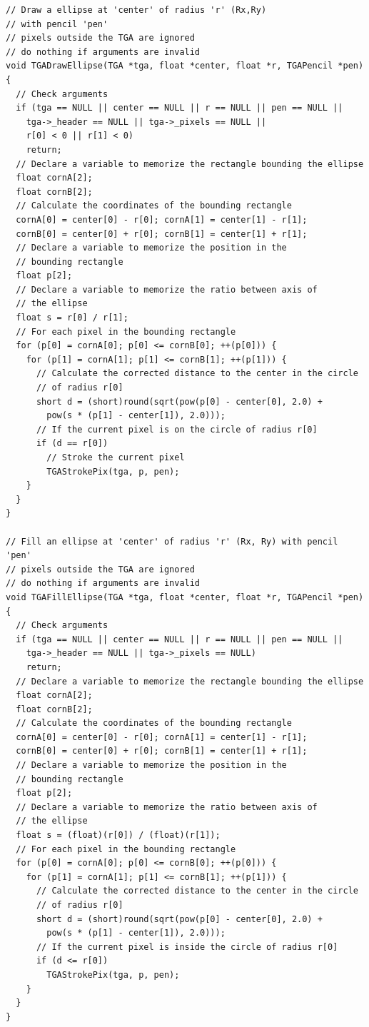 \documentclass[12pt, a4paper]{article}
\begin{document}
\begin{scriptsize}
\begin{ttfamily}
\begin{lstlisting}
// Draw a ellipse at 'center' of radius 'r' (Rx,Ry) 
// with pencil 'pen' 
// pixels outside the TGA are ignored
// do nothing if arguments are invalid
void TGADrawEllipse(TGA *tga, float *center, float *r, TGAPencil *pen) {
  // Check arguments
  if (tga == NULL || center == NULL || r == NULL || pen == NULL ||
    tga->_header == NULL || tga->_pixels == NULL || 
    r[0] < 0 || r[1] < 0)
    return;
  // Declare a variable to memorize the rectangle bounding the ellipse
  float cornA[2];
  float cornB[2];
  // Calculate the coordinates of the bounding rectangle
  cornA[0] = center[0] - r[0]; cornA[1] = center[1] - r[1];
  cornB[0] = center[0] + r[0]; cornB[1] = center[1] + r[1];
  // Declare a variable to memorize the position in the 
  // bounding rectangle
  float p[2];
  // Declare a variable to memorize the ratio between axis of 
  // the ellipse
  float s = r[0] / r[1];
  // For each pixel in the bounding rectangle
  for (p[0] = cornA[0]; p[0] <= cornB[0]; ++(p[0])) {
    for (p[1] = cornA[1]; p[1] <= cornB[1]; ++(p[1])) {
      // Calculate the corrected distance to the center in the circle
      // of radius r[0] 
      short d = (short)round(sqrt(pow(p[0] - center[0], 2.0) + 
        pow(s * (p[1] - center[1]), 2.0)));
      // If the current pixel is on the circle of radius r[0]
      if (d == r[0]) 
        // Stroke the current pixel
        TGAStrokePix(tga, p, pen);
    }
  }
}

// Fill an ellipse at 'center' of radius 'r' (Rx, Ry) with pencil 'pen'
// pixels outside the TGA are ignored
// do nothing if arguments are invalid
void TGAFillEllipse(TGA *tga, float *center, float *r, TGAPencil *pen) {
  // Check arguments
  if (tga == NULL || center == NULL || r == NULL || pen == NULL ||
    tga->_header == NULL || tga->_pixels == NULL)
    return;
  // Declare a variable to memorize the rectangle bounding the ellipse
  float cornA[2];
  float cornB[2];
  // Calculate the coordinates of the bounding rectangle
  cornA[0] = center[0] - r[0]; cornA[1] = center[1] - r[1];
  cornB[0] = center[0] + r[0]; cornB[1] = center[1] + r[1];
  // Declare a variable to memorize the position in the 
  // bounding rectangle
  float p[2];
  // Declare a variable to memorize the ratio between axis of 
  // the ellipse
  float s = (float)(r[0]) / (float)(r[1]);
  // For each pixel in the bounding rectangle
  for (p[0] = cornA[0]; p[0] <= cornB[0]; ++(p[0])) {
    for (p[1] = cornA[1]; p[1] <= cornB[1]; ++(p[1])) {
      // Calculate the corrected distance to the center in the circle
      // of radius r[0] 
      short d = (short)round(sqrt(pow(p[0] - center[0], 2.0) + 
        pow(s * (p[1] - center[1]), 2.0)));
      // If the current pixel is inside the circle of radius r[0]
      if (d <= r[0]) 
        TGAStrokePix(tga, p, pen);
    }
  }
}


\end{lstlisting}
\end{ttfamily}
\end{scriptsize}
\end{document}
